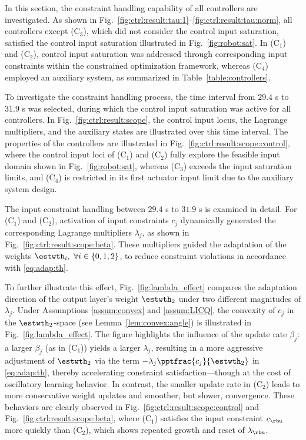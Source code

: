 \documentclass[letterpaper, journal]{IEEEtran}
\begin{document}
In this section, the constraint handling capability of all controllers are investigated.
As shown in Fig.~\ref{fig:ctrl:result:tau:1}–\ref{fig:ctrl:result:tau:norm}, all controllers except (C$_3$), which did not consider the control input saturation, satisfied the control input saturation illustrated in Fig.~\ref{fig:robot:sat}.
In (C$_1$) and (C$_2$), control input saturation was addressed through corresponding input constraints within the constrained optimization framework, whereas (C$_4$) employed an auxiliary system, as summarized in Table~\ref{table:controllers}.

To investigate the constraint handling process, the time interval from $29.4$ s to $31.9$ s was selected, during which the control input saturation was active for all controllers.
In Fig.~\ref{fig:ctrl:result:scope}, the control input locus, the Lagrange multipliers, and the auxiliary states are illustrated over this time interval.
The properties of the controllers are illustrated in Fig.~\ref{fig:ctrl:result:scope:control}, where the control input loci of (C$_1$) and (C$_2$) fully explore the feasible input domain shown in Fig.~\ref{fig:robot:sat}, whereas (C$_3$) exceeds the input saturation limits, and (C$_4$) is restricted in its first actuator input limit due to the auxiliary system design.

The input constraint handling between $29.4$ s to $31.9$ s is examined in detail. 
For (C$_1$) and (C$_2$), activation of input constraints $c_j$ dynamically generated the corresponding Lagrange multipliers $\lambda_j$, as shown in Fig.~\ref{fig:ctrl:result:scope:beta}. 
These multipliers guided the adaptation of the weights $\estwth_i,\ \forall i\in\{0,1,2\}$, to reduce constraint violations in accordance with \eqref{eq:adap:th}.

To further illustrate this effect, Fig.~\ref{fig:lambda_effect} compares the adaptation direction of the output layer's weight $\estwth_2$ under two different magnitudes of $\lambda_j$. 
Under Assumptions \ref{assum:convex} and \ref{assum:LICQ}, the convexity of $c_j$ in the $\estwth_2$-space (see Lemma~\ref{lem:convex:angle}) is illustrated in Fig.~\ref{fig:lambda_effect}.
The figure highlights the influence of the update rate $\beta_j$: a larger $\beta_j$ (as in (C$_1$)) yields a larger $\lambda_j$, resulting in a more aggressive adjustment of $\estwth_2$ via the term $-\lambda_j\pptfrac{c_j}{\estwth_2}$ in \eqref{eq:adap:th}, thereby accelerating constraint satisfaction—though at the cost of oscillatory learning behavior. 
In contrast, the smaller update rate in (C$_2$) leads to more conservative weight updates and smoother, but slower, convergence.
These behaviors are clearly observed in Fig.~\ref{fig:ctrl:result:scope:control} and Fig.~\ref{fig:ctrl:result:scope:beta}, where (C$_1$) satisfies the input constraint $c_{\rbu}$ more quickly than (C$_2$), which shows repeated growth and reset of $\lambda_{\rbu}$. 
\end{document}
